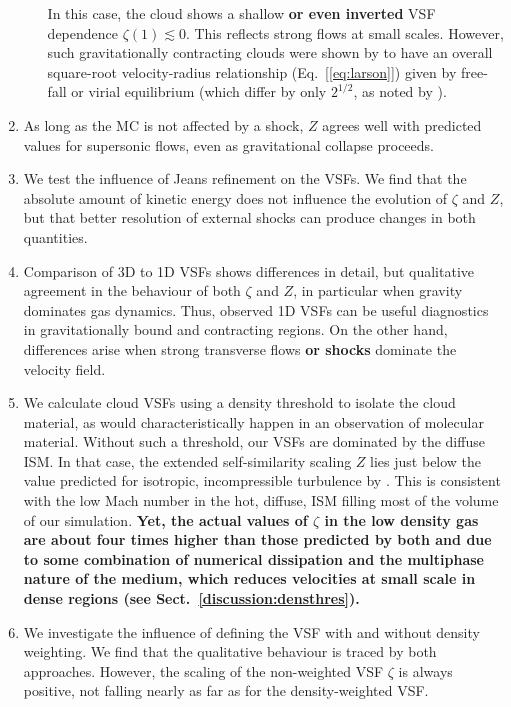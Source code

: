 \begin{enumerate}
\begin{itemize}
        In this case, the cloud shows a shallow \textbf{or even inverted} VSF dependence $\zeta(1) \lesssim 0$. 
        This reflects strong flows at small scales. However, such gravitationally contracting clouds were shown by  to have an overall square-root velocity-radius relationship (Eq.~[\ref{eq:larson}]) given by free-fall or virial equilibrium (which differ by only $2^{1/2}$, as noted by \citealt{Ballesteros2011}).
    \end{itemize}
	\item As long as the MC is not affected by a shock, $Z$ agrees well with predicted values for supersonic flows, even as gravitational collapse proceeds.
	\item We test the influence of Jeans refinement on the VSFs. We find that the absolute amount of kinetic energy does not influence the evolution of $\zeta$ and $Z$, but that better resolution of external shocks can produce changes in both quantities.
	\item Comparison of 3D to 1D VSFs shows differences in detail, but qualitative agreement in the behaviour of both $\zeta$ and $Z$, in particular when gravity dominates gas dynamics. 
	Thus, observed 1D VSFs can be useful diagnostics in gravitationally bound and contracting regions. 
	On the other hand, differences arise when strong transverse flows \textbf{or shocks} dominate the velocity field. 
	\item We calculate cloud VSFs using a density threshold to isolate the cloud material, as would characteristically happen in an observation of molecular material. 
	Without such a threshold, our VSFs are dominated by the diffuse ISM. In that case, the extended self-similarity scaling $Z$ lies just below the value predicted for isotropic, incompressible turbulence by \citet{She1994}. 
	This is consistent with the low Mach number in the hot, diffuse, ISM filling most of the volume of our simulation.
	\textbf{
    Yet, the actual values of $\zeta$ in the low density gas are about four times higher than those predicted by both \citet{She1994} and \citet{Boldyrev2002} due to some combination of numerical dissipation and the multiphase nature of the medium, which reduces velocities at small scale in dense regions (see Sect.\ \ref{discussion:densthres}).
	}
	\item We investigate the influence of defining the VSF with and without density weighting. 
	We find that the qualitative behaviour is traced by both approaches. 
	However, the scaling of the non-weighted VSF $\zeta$ is always positive, not falling nearly as far as for the density-weighted VSF. 

\end{enumerate}
